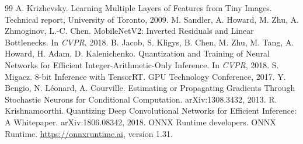 \documentclass[11pt,a4paper]{ctexart}
\begin{document}
\begin{thebibliography}{99}
 A. Krizhevsky. Learning Multiple Layers of Features from Tiny Images. Technical report, University of Toronto, 2009.
 M. Sandler, A. Howard, M. Zhu, A. Zhmoginov, L.-C. Chen. MobileNetV2: Inverted Residuals and Linear Bottlenecks. In \emph{CVPR}, 2018.
 B. Jacob, S. Kligys, B. Chen, M. Zhu, M. Tang, A. Howard, H. Adam, D. Kalenichenko. Quantization and Training of Neural Networks for Efficient Integer-Arithmetic-Only Inference. In \emph{CVPR}, 2018.
 S. Migacz. 8-bit Inference with TensorRT. GPU Technology Conference, 2017.
 Y. Bengio, N. L\'eonard, A. Courville. Estimating or Propagating Gradients Through Stochastic Neurons for Conditional Computation. arXiv:1308.3432, 2013.
 R. Krishnamoorthi. Quantizing Deep Convolutional Networks for Efficient Inference: A Whitepaper. arXiv:1806.08342, 2018.
 ONNX Runtime developers. ONNX Runtime. \url{https://onnxruntime.ai}, version 1.31.
\end{thebibliography}
\end{document}
